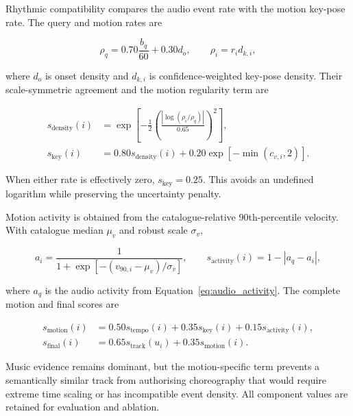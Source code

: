 Rhythmic compatibility compares the audio event rate with the motion key-pose
rate. The query and motion rates are

\begin{equation}
    \rho_q=0.70\frac{b_q}{60}+0.30d_o,
    \qquad
    \rho_i=r_i d_{k,i},
    \label{eq:ch5_event_rates}
\end{equation}

where $d_o$ is onset density and $d_{k,i}$ is confidence-weighted key-pose
density. Their scale-symmetric agreement and the motion regularity term are

\begin{align}
    s_{\mathrm{density}}(i)
      &=\exp\!\left[-\frac{1}{2}
        \left(\frac{|\log(\rho_i/\rho_q)|}{0.65}\right)^2\right],\\
    s_{\mathrm{key}}(i)
      &=0.80s_{\mathrm{density}}(i)
        +0.20\exp\!\left[-\min(c_{v,i},2)\right].
    \label{eq:ch5_keypoint_score}
\end{align}

When either rate is effectively zero, $s_{\mathrm{key}}=0.25$. This avoids an
undefined logarithm while preserving the uncertainty penalty.

Motion activity is obtained from the catalogue-relative 90th-percentile
velocity. With catalogue median $\mu_v$ and robust scale $\sigma_v$,

\begin{equation}
    a_i=\frac{1}{1+\exp[-(v_{90,i}-\mu_v)/\sigma_v]},
    \qquad
    s_{\mathrm{activity}}(i)=1-|a_q-a_i|,
    \label{eq:ch5_activity_score}
\end{equation}

where $a_q$ is the audio activity from
Equation~\ref{eq:audio_activity}. The complete motion and final scores are

\begin{align}
    s_{\mathrm{motion}}(i)
      &=0.50s_{\mathrm{tempo}}(i)
        +0.35s_{\mathrm{key}}(i)
        +0.15s_{\mathrm{activity}}(i),\\
    s_{\mathrm{final}}(i)
      &=0.65s_{\mathrm{track}}(u_i)
        +0.35s_{\mathrm{motion}}(i).
    \label{eq:ch5_final_motion_score}
\end{align}

Music evidence remains dominant, but the motion-specific term prevents a
semantically similar track from authorising choreography that would require
extreme time scaling or has incompatible event density. All component values
are retained for evaluation and ablation.

